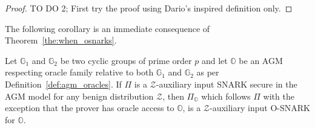 \begin{proof}{\color{red}TO DO 2; First try the proof using Dario's inspired definition only.}
\begin{comment} Write a proof inspired by We denote by $\mathcal{Z}_{\mathbb{O}}$ the 
probability distribution of all the public parameters that define a member of $\mathbb{O}$ together with some 
polynomial number $Q$ of queries and answers to $\mathbb{O}$. More formally: 
$\mathcal{Z}_{\mathbb{O}} = (\mathit{pp}, \{\mathcal{O}(q_i), q_i\}_{i=1}^Q)$, 
$Q = \mathsf{poly}(\lambda)$, $(\mathit{pp}, \mathcal{O}) \leftarrow \mathbb{O}$. Then every $\mathcal{Z}_{\mathbb{O}}$-auxiliary 
input SNARK $\Pi$ secure in the AGM model with respect to $\mathbb{G}$ is an O-SNARK for $\mathbb{O}$ secure in the AGM model.
\end{comment}
\end{proof}

\noindent The following corollary is an immediate consequence of Theorem~\ref{the:when_osnarks}.
\begin{corollary}
Let $\mathbb{G}_1$ and  $\mathbb{G}_2$ be two cyclic groups of prime order $p$ and let $\mathbb{O}$ be 
an AGM respecting oracle family relative to both $\mathbb{G}_1$ and $\mathbb{G}_2$ as per Definition~\ref{def:agm_oracles}. 
If $\Pi$ is a $\mathcal{Z}$-auxiliary input SNARK secure in the AGM model for any benign 
distribution $\mathcal{Z}$, then $\Pi_{\mathbb{O}}$ which follows $\Pi$ with the exception that the prover has oracle access 
to $\mathbb{O}$, is a $\mathcal{Z}$-auxiliary input O-SNARK for $\mathbb{O}$. 
\end{corollary}
